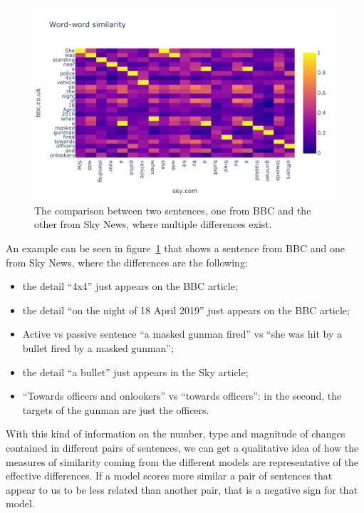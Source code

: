 \begin{figure}[!htb]
    \centering
    \includegraphics[width=\linewidth]{figures/lyra.pdf}
    \caption{The comparison between two sentences, one from BBC and the other from Sky News, where multiple differences exist.}
    \label{fig:lyra}
\end{figure}

An example can be seen in figure~\ref{fig:lyra} that shows a sentence from BBC and one from Sky News, where the differences are the following:

\begin{itemize}
    \item the detail ``4x4'' just appears on the BBC article;
    \item the detail ``on the night of 18 April 2019'' just appears on the BBC article;
    \item Active vs passive sentence ``a masked gunman fired'' vs ``she was hit by a bullet fired by a masked gunman'';
    \item the detail ``a bullet'' just appears in the Sky article;
    \item ``Towards officers and onlookers'' vs ``towards officers'': in the second, the targets of the gunman are just the officers.
\end{itemize}

With this kind of information on the number, type and magnitude of changes contained in different pairs of sentences, we can get a qualitative idea of how the measures of similarity coming from the different models are representative of the effective differences. If a model scores more similar a pair of sentences that appear to us to be less related than another pair, that is a negative sign for that model. 


